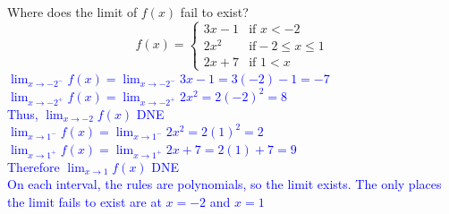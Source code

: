 \documentclass{ximera}
\begin{document}
\begin{exercise}
    Where does the limit of $f(x)$ fail to exist?  
      \[f(x)=
    \begin{cases}
    3x-1 &\text{if }x<-2\\
    2x^2 &\text{if} -2\leq x\leq 1\\
    2x+7 & \text{if } 1<x
    \end{cases}\]
    \textcolor{blue}{ $\displaystyle \lim_{x\rightarrow -2^-}f(x)=\lim_{x\rightarrow -2^-} 3x-1=3(-2)-1=-7$\\
    $\displaystyle \lim_{x\rightarrow -2^+} f(x)=\lim_{x\rightarrow -2^+ }2x^2=2(-2)^2=8$\\
    Thus, $\displaystyle \lim_{x\rightarrow -2}f(x)$ DNE\\
    $\displaystyle\lim_{x\rightarrow 1^-} f(x)=\lim_{x\rightarrow 1^-} 2x^2=2(1)^2=2$\\
    $\displaystyle\lim_{x\rightarrow 1^+} f(x)=\lim_{x\rightarrow 1^+} 2x+7=2(1)+7=9$\\
    Therefore $\displaystyle\lim_{x\rightarrow 1} f(x)$ DNE\\
    On each interval, the rules are polynomials, so the limit exists.  The only places the limit fails to exist are at $x=-2$ and $x=1$}
\end{exercise}
\end{document}
